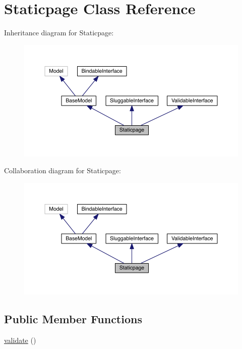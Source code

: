 \hypertarget{class_entity_1_1_staticpage}{\section{Staticpage Class Reference}
\label{class_entity_1_1_staticpage}
}


Inheritance diagram for Staticpage\-:
\nopagebreak
\begin{figure}[H]
\begin{center}
\leavevmode
\includegraphics[width=350pt]{class_entity_1_1_staticpage__inherit__graph}
\end{center}
\end{figure}


Collaboration diagram for Staticpage\-:
\nopagebreak
\begin{figure}[H]
\begin{center}
\leavevmode
\includegraphics[width=350pt]{class_entity_1_1_staticpage__coll__graph}
\end{center}
\end{figure}
\subsection*{Public Member Functions}
\begin{DoxyCompactItemize}
\item 
\hyperlink{class_entity_1_1_staticpage_a184909dab34698899937d810a9f5d393}{validate} ()
\end{DoxyCompactItemize}

